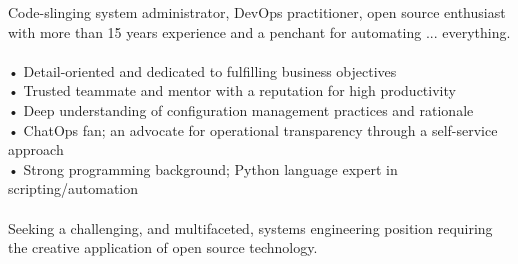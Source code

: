 

\begin{cvparagraph}





Code-slinging system administrator, DevOps practitioner, open source enthusiast \\
with more than 15 years experience and a penchant for automating ... everything. \\
\\
• Detail-oriented and dedicated to fulfilling business objectives \\
• Trusted teammate and mentor with a reputation for high productivity \\
• Deep understanding of configuration management practices and rationale \\
• ChatOps fan; an advocate for operational transparency through a self-service approach \\
• Strong programming background; Python language expert in scripting/automation \\
\\
Seeking a challenging, and multifaceted, systems engineering position requiring the creative application of open source technology.
\end{cvparagraph}
